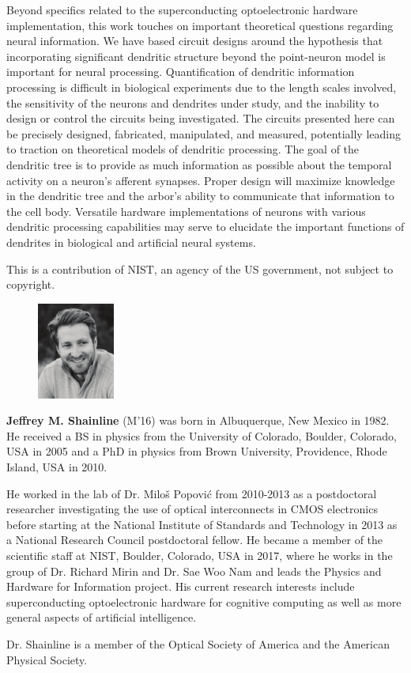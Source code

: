 \documentclass[twocolumn]{article}
\begin{document}
Beyond specifics related to the superconducting optoelectronic hardware implementation, this work touches on important theoretical questions regarding neural information. We have based circuit designs around the hypothesis that incorporating significant dendritic structure beyond the point-neuron model is important for neural processing. Quantification of dendritic information processing is difficult in biological experiments due to the length scales involved, the sensitivity of the neurons and dendrites under study, and the inability to design or control the circuits being investigated. The circuits presented here can be precisely designed, fabricated, manipulated, and measured, potentially leading to traction on theoretical models of dendritic processing. The goal of the dendritic tree is to provide as much information as possible about the temporal activity on a neuron's afferent synapses. Proper design will maximize knowledge in the dendritic tree and the arbor's ability to communicate that information to the cell body. Versatile hardware implementations of neurons with various dendritic processing capabilities may serve to elucidate the important functions of dendrites in biological and artificial neural systems.

\vspace{2em}
This is a contribution of NIST, an agency of the US government, not subject to copyright.




\begin{figure} 
    \includegraphics[width=1in,height=1.25in,clip,keepaspectratio]{_12_shainline.pdf}
  \end{figure}\par
  \textbf{Jeffrey M. Shainline} (M'16) was born in Albuquerque, New Mexico in 1982. He received a BS in physics from the University of Colorado, Boulder, Colorado, USA in 2005 and a PhD in physics from Brown University, Providence, Rhode Island, USA in 2010.
  \par
  He worked in the lab of Dr. Milo\v{s} Popovi\'{c} from 2010-2013 as a postdoctoral researcher investigating the use of optical interconnects in CMOS electronics before starting at the National Institute of Standards and Technology in 2013 as a National Research Council postdoctoral fellow. He became a member of the scientific staff at NIST, Boulder, Colorado, USA in 2017, where he  works in the group of Dr. Richard Mirin and Dr. Sae Woo Nam and leads the Physics and Hardware for Information project. His current research interests include superconducting optoelectronic hardware for cognitive computing as well as more general aspects of artificial intelligence.
 \par
 Dr. Shainline is a member of the Optical Society of America and the American Physical Society.
\end{document}
